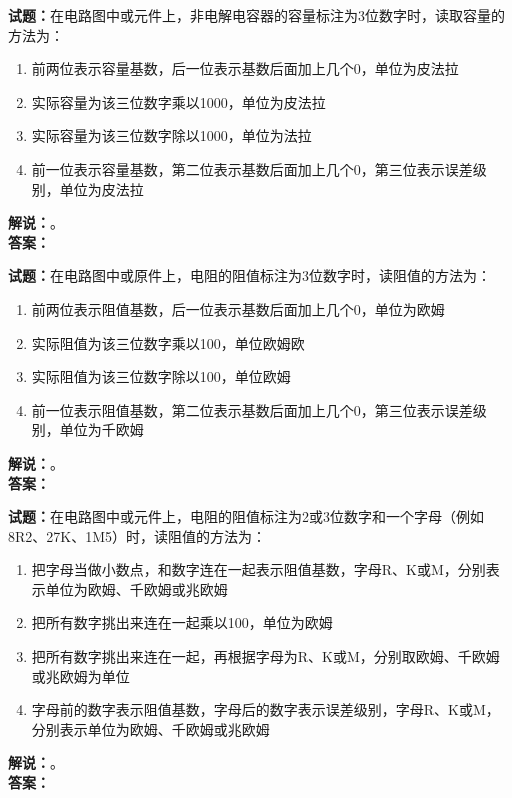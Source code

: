 \documentclass{ctexbook}
\begin{document}
\vspace{\baselineskip}

\noindent\textbf{试题：}在电路图中或元件上，非电解电容器的容量标注为3位数字时，读取容量的方法为：
\begin{enumerate}[leftmargin=3em]
  \item 前两位表示容量基数，后一位表示基数后面加上几个0，单位为皮法拉
  \item 实际容量为该三位数字乘以1000，单位为皮法拉
  \item 实际容量为该三位数字除以1000，单位为法拉
  \item 前一位表示容量基数，第二位表示基数后面加上几个0，第三位表示误差级别，单位为皮法拉
\end{enumerate}
\noindent\textbf{解说：}\textbf{}。\\\noindent\textbf{答案：}

\vspace{\baselineskip}

\noindent\textbf{试题：}在电路图中或原件上，电阻的阻值标注为3位数字时，读阻值的方法为：
\begin{enumerate}[leftmargin=3em]
  \item 前两位表示阻值基数，后一位表示基数后面加上几个0，单位为欧姆
  \item 实际阻值为该三位数字乘以100，单位欧姆欧
  \item 实际阻值为该三位数字除以100，单位欧姆
  \item 前一位表示阻值基数，第二位表示基数后面加上几个0，第三位表示误差级别，单位为千欧姆
\end{enumerate}
\noindent\textbf{解说：}\textbf{}。\\\noindent\textbf{答案：}

\vspace{\baselineskip}

\noindent\textbf{试题：}在电路图中或元件上，电阻的阻值标注为2或3位数字和一个字母（例如8R2、27K、1M5）时，读阻值的方法为：
\begin{enumerate}[leftmargin=3em]
  \item 把字母当做小数点，和数字连在一起表示阻值基数，字母R、K或M，分别表示单位为欧姆、千欧姆或兆欧姆
  \item 把所有数字挑出来连在一起乘以100，单位为欧姆
  \item 把所有数字挑出来连在一起，再根据字母为R、K或M，分别取欧姆、千欧姆或兆欧姆为单位
  \item 字母前的数字表示阻值基数，字母后的数字表示误差级别，字母R、K或M，分别表示单位为欧姆、千欧姆或兆欧姆
\end{enumerate}
\noindent\textbf{解说：}\textbf{}。\\\noindent\textbf{答案：}
\end{document}
